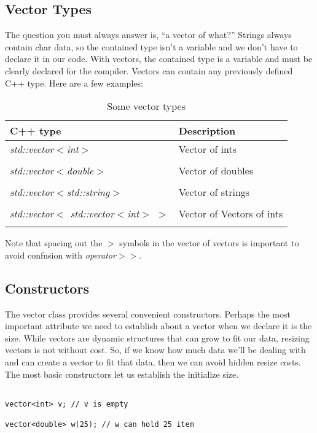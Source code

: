 \documentclass[]{tufte-handout}
\begin{document}
\subsection{Vector Types}
The question you must always answer is, ``a vector of what?''  Strings always contain char data, so the contained type isn't a variable and we don't have to declare it in our code. With vectors, the contained type is a variable and must be clearly declared for the compiler. Vectors can contain any previously defined C++ type. Here are a few examples:

\begin{table}[ht]
\center
\small
\caption{Some vector types}
\begin{tabular}{ll}
C++ type & Description\\ \hline
\textit{std::vector$<$int$>$} & Vector of ints \\ \\
\textit{std::vector$<$double$>$} & Vector of doubles \\ \\
\textit{std::vector$<$std::string$>$} & Vector of strings \\ \\
\textit{std::vector$<$ std::vector$<$int$>$ $>$} & Vector of Vectors of ints\\ \\ 
\end{tabular}
\end{table}

Note that spacing out the $>$ symbols in the vector of vectors is important to avoid confusion with \textit{operator$>>$}. 

\subsection{Constructors}

The vector class provides several convenient constructors. Perhaps the most important attribute we need to establish about a vector when we declare it is the size.  While vectors are dynamic structures that can grow to fit our data, resizing vectors is not without cost.  So, if we know how much data we'll be dealing with and can create a vector to fit that data, then we can avoid hidden resize costs. The most basic constructors let us establish the initialize size. 

\begin{verbatim}

vector<int> v; // v is empty

vector<double> w(25); // w can hold 25 item

\end{verbatim}
\end{document}
